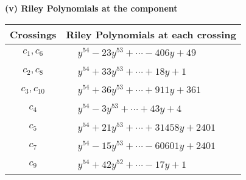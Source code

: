 \documentclass[1p]{elsarticle_modified}
\theoremstyle{definition}
\begin{document}
\newpage\renewcommand{\arraystretch}{1}
\flushleft \textbf{(v) Riley Polynomials at the component}\newline \\
\begin{tabular}{m{50pt}|m{274pt}}
Crossings & \hspace{64pt}Riley Polynomials at each crossing \\
\hline $$\begin{aligned}c_{1},c_{6}\end{aligned}$$&$\begin{aligned}
&y^{54}-23 y^{53}+\cdots-406 y+49
\end{aligned}$\\
\hline $$\begin{aligned}c_{2},c_{8}\end{aligned}$$&$\begin{aligned}
&y^{54}+33 y^{53}+\cdots+18 y+1
\end{aligned}$\\
\hline $$\begin{aligned}c_{3},c_{10}\end{aligned}$$&$\begin{aligned}
&y^{54}+36 y^{53}+\cdots+911 y+361
\end{aligned}$\\
\hline $$\begin{aligned}c_{4}\end{aligned}$$&$\begin{aligned}
&y^{54}-3 y^{53}+\cdots+43 y+4
\end{aligned}$\\
\hline $$\begin{aligned}c_{5}\end{aligned}$$&$\begin{aligned}
&y^{54}+21 y^{53}+\cdots+31458 y+2401
\end{aligned}$\\
\hline $$\begin{aligned}c_{7}\end{aligned}$$&$\begin{aligned}
&y^{54}-15 y^{53}+\cdots-60601 y+2401
\end{aligned}$\\
\hline $$\begin{aligned}c_{9}\end{aligned}$$&$\begin{aligned}
&y^{54}+42 y^{52}+\cdots-17 y+1
\end{aligned}$\\
\hline
\end{tabular}\\~\\
\end{document}
